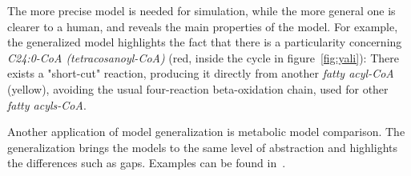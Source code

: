 \documentclass[9pt]{article}
\newcounter{fig}
\begin{document}
The more precise model is needed for simulation, while the more general one is clearer to a human, and reveals the main properties of the model. For example, the generalized model highlights the fact that there is a particularity concerning \textit{C24:0-CoA (tetracosanoyl-CoA)} (red, inside the cycle in figure~\ref{fig:yali}): There exists a "short-cut" reaction, producing it directly from another \textit{fatty acyl-CoA} (yellow), avoiding the usual four-reaction beta-oxidation chain, used for other \textit{fatty acyls-CoA}.

Another application of model generalization is metabolic model comparison. The generalization brings the models to the same level of abstraction and highlights the differences such as gaps. Examples can be found in~\citep{Zhukova}.


\end{document}
